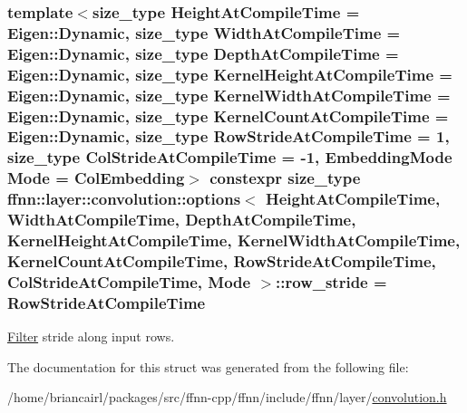 \hypertarget{structffnn_1_1layer_1_1convolution_1_1options_af557eea786920cd6341ca8a0498d3791}{
\subsubsection[{row\-\_\-stride}]{\setlength{\rightskip}{0pt plus 5cm}template$<$size\-\_\-type Height\-At\-Compile\-Time = Eigen\-::\-Dynamic, size\-\_\-type Width\-At\-Compile\-Time = Eigen\-::\-Dynamic, size\-\_\-type Depth\-At\-Compile\-Time = Eigen\-::\-Dynamic, size\-\_\-type Kernel\-Height\-At\-Compile\-Time = Eigen\-::\-Dynamic, size\-\_\-type Kernel\-Width\-At\-Compile\-Time = Eigen\-::\-Dynamic, size\-\_\-type Kernel\-Count\-At\-Compile\-Time = Eigen\-::\-Dynamic, size\-\_\-type Row\-Stride\-At\-Compile\-Time = 1, size\-\_\-type Col\-Stride\-At\-Compile\-Time = -\/1, Embedding\-Mode Mode = Col\-Embedding$>$ constexpr {\bf size\-\_\-type} {\bf ffnn\-::layer\-::convolution\-::options}$<$ Height\-At\-Compile\-Time, Width\-At\-Compile\-Time, Depth\-At\-Compile\-Time, Kernel\-Height\-At\-Compile\-Time, Kernel\-Width\-At\-Compile\-Time, Kernel\-Count\-At\-Compile\-Time, Row\-Stride\-At\-Compile\-Time, Col\-Stride\-At\-Compile\-Time, Mode $>$\-::row\-\_\-stride = Row\-Stride\-At\-Compile\-Time\hspace{0.3cm}{\ttfamily [static]}}}\label{structffnn_1_1layer_1_1convolution_1_1options_af557eea786920cd6341ca8a0498d3791}


\hyperlink{structffnn_1_1layer_1_1convolution_1_1_filter}{Filter} stride along input rows. 



The documentation for this struct was generated from the following file\-:\begin{DoxyCompactItemize}
\item 
/home/briancairl/packages/src/ffnn-\/cpp/ffnn/include/ffnn/layer/\hyperlink{convolution_8h}{convolution.\-h}\end{DoxyCompactItemize}
